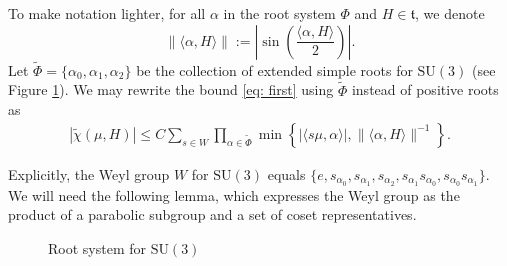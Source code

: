 \documentclass{amsart}
\numberwithin{equation}{section}
\numberwithin{equation}{section}
\begin{document}
To make notation lighter, for all $\alpha$ in the root system $\Phi$ and $H\in\mathfrak{t}$, we denote 
    $$\|\langle\alpha,H\rangle\|:=\left|\sin\left(\frac{\langle\alpha, H\rangle}{2 }\right)\right|.$$
Let $\widetilde{\Phi}=\{\alpha_0,\alpha_1,\alpha_2\}$ be the collection of extended simple roots for $\mathrm{SU}(3)$ (see Figure \ref{fig:roots}).
We may rewrite the bound \eqref{eq: first} using $\widetilde{\Phi}$ instead of positive roots as 
\begin{align}\label{eq: main bd}
    |\widetilde{\chi}(\mu, H)|\leq C\sum_{s\in W}\prod_{\alpha\in\widetilde{\Phi}}\min\left\{|\langle s\mu,\alpha\rangle|,   \|\langle\alpha,H\rangle\|^{-1}\right\}.
\end{align}

Explicitly, the Weyl group $W$ for $\mathrm{SU}(3)$ equals $\{e, s_{\alpha_0}, s_{\alpha_1}, s_{\alpha_2}, s_{\alpha_{1}}s_{\alpha_{0}}, s_{\alpha_{0}}s_{\alpha_{1}}\}$. We will need the following lemma, which expresses the Weyl group as the product of a parabolic subgroup and a set of coset representatives. 

\begin{figure}
    \centering
{}

    
    \caption{Root system for $\mathrm{SU}(3)$}
    \label{fig:roots}
\end{figure}
\end{document}

